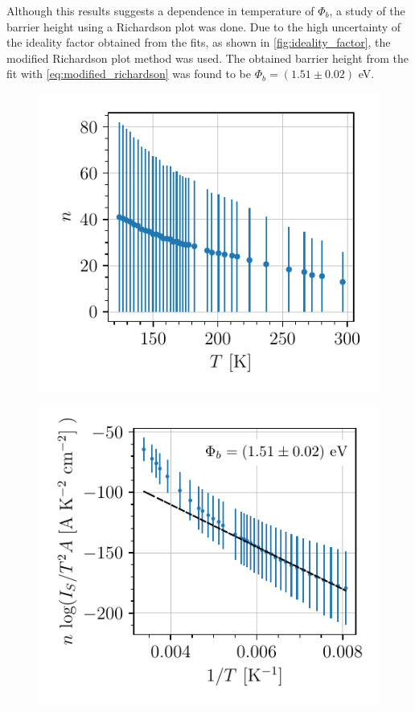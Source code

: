 Although this results suggests a dependence in temperature of $\Phi_b$, a study of the barrier height using a Richardson plot was done. Due to the high uncertainty of the ideality factor obtained from the fits, as shown in \autoref{fig:ideality_factor}, the modified Richardson plot method was used. The obtained barrier height from the fit with \autoref{eq:modified_richardson} was found to be $\Phi_b = (1.51 \pm 0.02)$ eV.
\begin{figure}[htbp]
    \centering
    \begin{minipage}[t]{0.49\textwidth}
        \centering
        \captionsetup{width=.95\linewidth}
        \includegraphics[width=\textwidth]{figures/iv-ideality-factor.pdf}
        \label{fig:ideality_factor}
    \end{minipage}
    \begin{minipage}[t]{0.49\textwidth}
        \centering
        \captionsetup{width=.95\linewidth}
        \includegraphics[width=\textwidth]{figures/richardson.pdf}

\end{minipage}
\end{figure}
